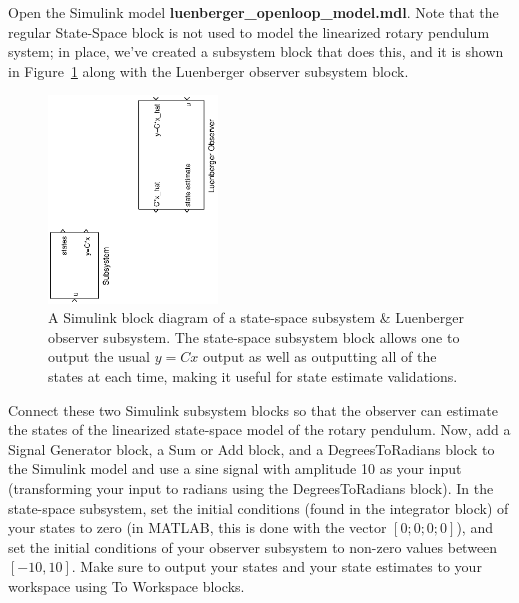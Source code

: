 \begin{enumerate}
          Open the Simulink model \textbf{luenberger\_openloop\_model.mdl}. Note that the regular State-Space block is not used to model the linearized rotary pendulum system; in place, we've created a subsystem block that does this, and it is shown in Figure~\ref{figure:lab3_statespace_block} along with the Luenberger observer subsystem block.
          \begin{figure}[htb!]
              \centering
              \includegraphics[width=0.4\textwidth,angle=-90]{eps/lab_3/luenberger_openloop_student}
              \caption{A Simulink block diagram of a state-space subsystem \& Luenberger observer subsystem. The state-space subsystem block allows one to output the usual $y=Cx$ output as well as outputting all of the states at each time, making it useful for state estimate validations.}
              \label{figure:lab3_statespace_block}
          \end{figure}

          Connect these two Simulink subsystem blocks so that the observer can estimate the states of the linearized state-space model of the rotary pendulum. Now, add a Signal Generator block, a Sum or Add block, and a DegreesToRadians block to the Simulink model and use a sine signal with amplitude 10 as your input (transforming your input to radians using the DegreesToRadians block). In the state-space subsystem, set the initial conditions (found in the integrator block) of your states to zero (in MATLAB, this is done with the vector $[0;0;0;0]$), and set the initial conditions of your observer subsystem to non-zero values between $[-10,10]$. Make sure to output your states and your state estimates to your workspace using To Workspace blocks.


\end{enumerate}

